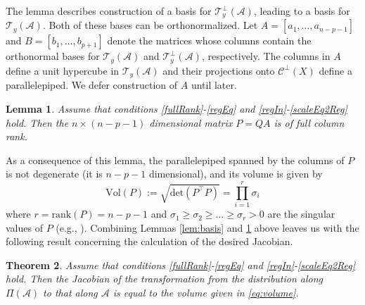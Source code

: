 \documentclass[ba]{imsart}
\newcommand{\mc}{\mathcal}
\newtheorem{theorem}{Theorem}[section]
\newtheorem{lemma}[theorem]{\bf Lemma}
\begin{document}
The lemma describes construction of a basis for $\mc T_{y}^\perp(\mc A)$, leading to a 
basis for $\mc T_{y}(\mc A)$.  Both of these bases can be orthonormalized.  
Let $A=[a_{1},\dots,a_{n-p-1}]$  and $B=[b_1,\dots,b_{p+1}]$ denote the 
matrices whose columns contain the orthonormal bases for  $\mc T_{y}(\mc A)$ and  $\mc T^{\perp}_{y}(\mc A)$, respectively.  
The columns in $A$ define a unit hypercube in $\mc T_{y}(\mc
  A)$ and their projections onto $\mc{C}^\perp(X)$ define a parallelepiped.
We defer construction of $A$ until later. 

\begin{lemma}
\label{lem:fullrank}
Assume that conditions \ref{fullRank}-\ref{regEq} and \ref{regIn}-\ref{scaleEq2Reg} hold.  
Then the $n\times (n-p-1)$ dimensional matrix $P=QA$ is of full column rank.
\end{lemma}

As a consequence of this lemma, 
the parallelepiped spanned by the columns of $P$ is not
degenerate (it is $n-p-1$ dimensional), and its volume
is given by
\begin{equation}
\label{eq:volume}
\text{Vol} (P) := \sqrt{\text{det}(P^\top P)}=\prod_{i=1}^{r} \sigma_i
\end{equation}
where $r=\text{rank} (P)=n-p-1$ and $\sigma_1\geq
\sigma_2\geq\dots\geq\sigma_r>0$ are the singular values of $P$ (e.g.,
\cite{miao1992}). 
Combining Lemmas \ref{lem:basis} and \ref{lem:fullrank} above leaves us with the following result concerning the calculation of the desired Jacobian.  
\begin{theorem}
\label{Jacobian}
Assume that conditions \ref{fullRank}-\ref{regEq} and \ref{regIn}-\ref{scaleEq2Reg} hold.  Then the
Jacobian of the transformation from the distribution along 
$\Pi(\mc A)$ to that along $\mc A $ is equal to the volume given in \eqref{eq:volume}.
\end{theorem}
\end{document}
